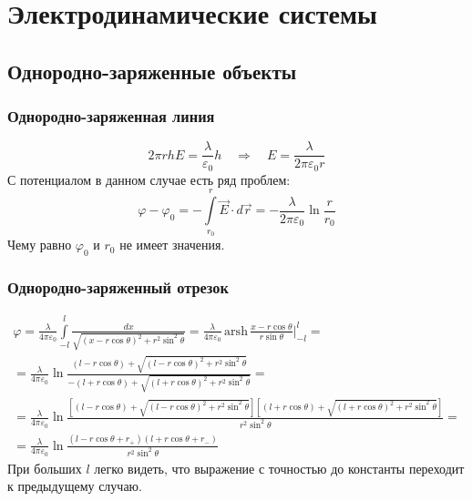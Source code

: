 \section{Электродинамические системы}

\subsection{Однородно-заряженные объекты}

\subsubsection{Однородно-заряженная линия}

\[
	2\pi r h E = \frac{\lambda}{\varepsilon_0} h 
	\quad \Rightarrow \quad
	E = \frac{\lambda}{2 \pi \varepsilon_0 r}
\]
С потенциалом в данном случае есть ряд проблем:
\[
	\varphi - \varphi_0 = - \int\limits_{r_0}^{r} \vec{E} \cdot d\vec{r} =
	- \frac{\lambda}{2\pi\varepsilon_0} \ln \frac{r}{r_0}
\]
Чему равно $\varphi_0$ и $r_0$ не имеет значения.

\subsubsection{Однородно-заряженный отрезок}

\[
	\begin{gathered}
	\varphi 
	= 
	\frac{\lambda}{4\pi\varepsilon_0} \int\limits_{-l}^{l} \frac{dx}{\sqrt{(x - r \cos \theta)^2 + r^2 \sin^2 \theta}} 
	=
	\frac{\lambda}{4\pi\varepsilon_0} \mathrm{\,arsh\,} \frac{x - r \cos \theta}{r \sin \theta} \Big|_{-l}^{l} 
	= \\ =
	\frac{\lambda}{4\pi\varepsilon_0} \ln \frac{(l - r \cos \theta) + \sqrt{(l - r \cos \theta)^2 + r^2 \sin^2 \theta}}{- (l + r \cos \theta) + \sqrt{(l + r \cos \theta)^2 + r^2 \sin^2 \theta}}
	= \\ =
	\frac{\lambda}{4\pi\varepsilon_0} \ln \frac{\left[(l - r \cos \theta) + \sqrt{(l - r \cos \theta)^2 + r^2 \sin^2 \theta}\right]\left[(l + r \cos \theta) + \sqrt{(l + r \cos \theta)^2 + r^2 \sin^2 \theta}\right]}{r^2 \sin^2\theta}
	= \\ =
	\frac{\lambda}{4\pi\varepsilon_0} \ln \frac{(l - r \cos \theta + r_+)(l + r \cos \theta + r_-)}{r^2 \sin^2\theta}
	\end{gathered}
\]
При больших $l$ легко видеть, что выражение с точностью до константы переходит к предыдущему случаю.

